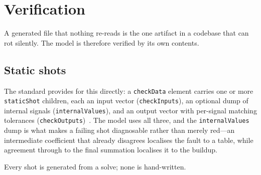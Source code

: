 \documentclass[11pt,a4paper]{article}
\begin{document}
\section{Verification}
\label{sec:verification}

A generated file that nothing re-reads is the one artifact in a codebase
that can rot silently. The model is therefore verified by its own
contents.

\subsection{Static shots}

The standard provides for this directly: a \texttt{checkData} element
carries one or more \texttt{staticShot} children, each an input vector
(\texttt{checkInputs}), an optional dump of internal signals
(\texttt{internalValues}), and an output vector with per-signal matching
tolerances (\texttt{checkOutputs})~\cite{davemlref}. The model uses all
three, and the \texttt{internalValues} dump is what makes a failing shot
diagnosable rather than merely red---an intermediate coefficient that
already disagrees localises the fault to a table, while agreement
through to the final summation localises it to the buildup.

Every shot is generated from a solve; none is hand-written.
\end{document}
